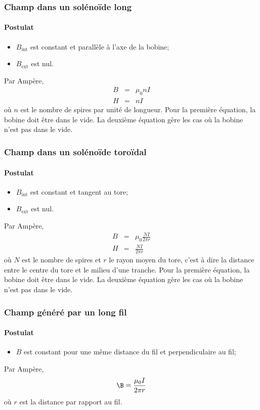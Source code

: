 \subsubsection{Champ dans un solénoïde long}
\label{sec:bbl}
\paragraph{Postulat}
\begin{itemize}
  \item $B_\mathrm{int}$ est constant et parallèle à l'axe de la bobine;
  \item $B_\mathrm{ext}$ est nul.
\end{itemize}
Par Ampère,
\begin{eqnarray*}
  B &=& \mu_0nI\\
  H &=& nI
\end{eqnarray*}
où $n$ est le nombre de spires par unité de longueur.
Pour la première équation, la bobine doit être dans le vide.
La deuxième équation gère les cas où la bobine n'est pas dans le vide.

\subsubsection{Champ dans un solénoïde toroïdal}
\label{sec:bst}
\paragraph{Postulat}
\begin{itemize}
  \item $B_\mathrm{int}$ est constant et tangent au tore;
  \item $B_\mathrm{ext}$ est nul.
\end{itemize}
Par Ampère,
\begin{eqnarray*}
  B &=& \mu_0\frac{NI}{2\pi r}\\
  H &=& \frac{NI}{2\pi r}
\end{eqnarray*}
où $N$ est le nombre de spires et $r$ le rayon moyen du tore,
c'est à dire la distance entre le centre du tore et le milieu d'une tranche.
Pour la première équation, la bobine doit être dans le vide.
La deuxième équation gère les cas où la bobine n'est pas dans le vide.

\subsubsection{Champ généré par un long fil}
\paragraph{Postulat}
\begin{itemize}
  \item $B$ est constant pour une même distance
    du fil et perpendiculaire au fil;
\end{itemize}
Par Ampère,
\[ \B = \frac{\mu_0I}{2\pi r} \]
où $r$ est la distance par rapport au fil.

